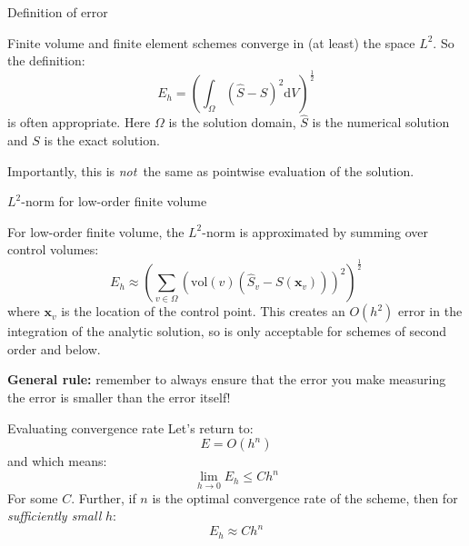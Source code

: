 \documentclass[t]{beamer}
\renewcommand{\vec}[1]{\boldsymbol{#1}}
\begin{document}
\begin{frame}{Definition of error}
  
  Finite volume and finite element schemes converge in (at least) the space
  $L^2$. So the definition:
  \begin{equation}
    E_h = \left(\int_\Omega(\hat{S}-S)^2\mathrm{d}V\right)^{\frac{1}{2}}
  \end{equation}
  is often appropriate. Here $\Omega$ is the solution domain, $\hat{S}$ is
  the numerical solution and $S$ is the exact solution.
  \vfill{}
  
  Importantly, this is \emph{not}\ the same as pointwise evaluation of the
  solution. 

\end{frame}

\begin{frame}{$L^2$-norm for low-order finite volume}
  
  For low-order finite volume, the $L^2$-norm is approximated by summing over
  control volumes:
  \begin{equation}
    E_h \approx \left(\sum_{v\in\Omega}\left(\mathrm{vol}(v)\left(\hat{S}_v - S(\vec{x}_v)\right)\right)^2\right)^{\frac{1}{2}}
  \end{equation}
  where $\vec{x}_v$ is the location of the control point. This creates an
  $O(h^2)$ error in the integration of the analytic solution, so is only
  acceptable for schemes of second order and below.
  \vfill{}

  \textbf{General rule:} remember to always ensure that the error you make
  measuring the error is smaller than the error itself!

\end{frame}

\begin{frame}{Evaluating convergence rate}
  Let's return to:
  \begin{equation}
    E=O(h^n)
  \end{equation}
  and which means:
  \begin{equation}
    \lim_{h\rightarrow 0} E_h\leq Ch^n
  \end{equation}
  For some $C$. \pause Further, if $n$ is the optimal convergence rate of the
  scheme, then for \emph{sufficiently small} $h$:
  \begin{equation}
    E_h\approx Ch^n    
  \end{equation}

\end{frame}
\end{document}
